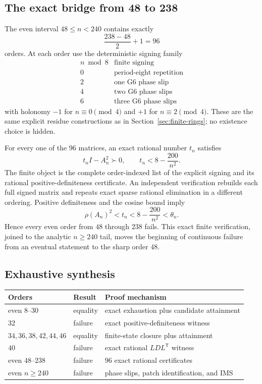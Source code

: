\subsection{The exact bridge from 48 to 238}
\label{subsec:exact-bridge-48-238}

The even interval \(48\leq n<240\) contains exactly
\[
\frac{238-48}{2}+1=96
\]
orders.  At each order use the deterministic signing family
\[
\begin{array}{c|l}
n\bmod8&\text{finite signing}\\ \hline
0&\text{period-eight repetition}\\
2&\text{one G6 phase slip}\\
4&\text{two G6 phase slips}\\
6&\text{three G6 phase slips}
\end{array}
\]
with holonomy \(-1\) for \(n\equiv0\pmod4\) and \(+1\) for
\(n\equiv2\pmod4\).  These are the same explicit residue constructions as
in Section~\ref{sec:finite-rings}; no existence choice is hidden.

For every one of the 96 matrices, an exact rational number \(t_n\) satisfies
\[
t_nI-A_n^2\succ0,\qquad
t_n<8-\frac{200}{n^2}.
\]
The finite object is the complete order-indexed list of the explicit signing
and its rational positive-definiteness certificate.  An independent
verification rebuilds each full signed matrix and repeats exact sparse
rational elimination in a different ordering.  Positive definiteness and
the cosine bound imply
\[
\rho(A_n)^2<t_n<8-\frac{200}{n^2}<\theta_n.
\]
Hence every even order from \(48\) through \(238\) fails.  This exact finite
verification, joined to the analytic \(n\geq240\) tail, moves the beginning
of continuous failure from an eventual statement to the sharp order \(48\).

\subsection{Exhaustive synthesis}
\label{subsec:exhaustive-synthesis}

\begin{center}
\begin{tabularx}{\textwidth}{@{}l l X@{}}
\toprule
Orders&Result&Proof mechanism\\
\midrule
even \(8\)--\(30\)&equality&exact exhaustion plus candidate attainment\\
\(32\)&failure&exact positive-definiteness witness\\
\(34,36,38,42,44,46\)&equality&finite-state closure plus attainment\\
\(40\)&failure&exact rational \(LDL^{\mathsf T}\) witness\\
even \(48\)--\(238\)&failure&96 exact rational certificates\\
even \(n\geq240\)&failure&phase slips, patch identification, and IMS\\
\bottomrule
\end{tabularx}
\end{center}

